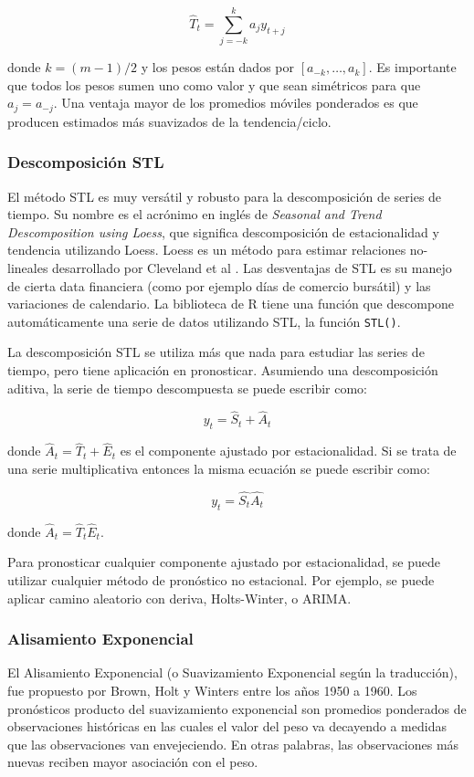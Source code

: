\[ \hat{T}_{t} = \sum_{j = -k}^{k} a_j y_{t + j}  \]

donde $k=(m-1)/2$ y los pesos están dados por $[a_{-k}, \ldots, a_{k}]$. Es importante que todos los pesos sumen uno como valor y que sean simétricos para que $a_{j} = a_{-j}$. Una ventaja mayor de los promedios móviles ponderados es que producen estimados más suavizados de la tendencia/ciclo.

\subsubsection{Descomposición STL}
El método STL es muy versátil y robusto para la descomposición de series de tiempo. Su nombre es el acrónimo en inglés de \emph{Seasonal and Trend Descomposition using Loess}, que significa descomposición de estacionalidad y tendencia utilizando Loess. Loess es un método para estimar relaciones no-lineales desarrollado por Cleveland et al \cite{hyndman}. Las desventajas de STL es su manejo de cierta data financiera (como por ejemplo días de comercio bursátil) y las variaciones de calendario. La biblioteca de R tiene una función que descompone automáticamente una serie de datos utilizando STL, la función \texttt{STL()}.

La descomposición STL se utiliza más que nada para estudiar las series de tiempo, pero tiene aplicación en pronosticar. Asumiendo una descomposición aditiva, la serie de tiempo descompuesta se puede escribir como:

\[ y_{t} = \hat{S}_t + \hat{A}_t \]

donde $\hat{A}_t = \hat{T}_t + \hat{E}_t$ es el componente ajustado por estacionalidad. Si se trata de una serie multiplicativa entonces la misma ecuación se puede escribir como:

\[ y_{t} = \hat{S_t}\hat{A_t}\]

donde $\hat{A}_t = \hat{T}_t\hat{E}_t$.

Para pronosticar cualquier componente ajustado por estacionalidad, se puede utilizar cualquier método de pronóstico no estacional. Por ejemplo, se puede aplicar camino aleatorio con deriva, Holts-Winter, o ARIMA.

\subsubsection{Alisamiento Exponencial}
El Alisamiento Exponencial (o Suavizamiento Exponencial según la traducción), fue propuesto por Brown, Holt y Winters entre los años 1950 a 1960. Los pronósticos producto del suavizamiento exponencial son promedios ponderados de observaciones históricas en las cuales el valor del peso va decayendo a medidas que las observaciones van envejeciendo. En otras palabras, las observaciones más nuevas reciben mayor asociación con el peso.

